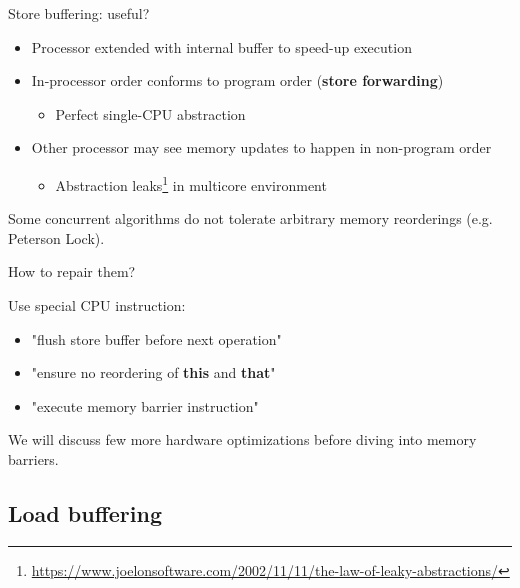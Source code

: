 \begin{frame}{Store buffering: useful?}

\begin{itemize}
    \item Processor extended with internal buffer to speed-up execution
    \item In-processor order conforms to program order (\textbf{store forwarding})
    \begin{itemize}
        \item Perfect single-CPU abstraction
    \end{itemize}
    \item Other processor may see memory updates to happen in non-program order
    \begin{itemize}
        \item Abstraction leaks\footnote{\tiny\url{https://www.joelonsoftware.com/2002/11/11/the-law-of-leaky-abstractions/}} in multicore environment
    \end{itemize}
\end{itemize}

\pause
Some concurrent algorithms do not tolerate arbitrary memory reorderings (e.g. Peterson Lock).

\pause

How to repair them?

\pause

Use special CPU instruction:
\begin{itemize}
    \pause
    \item "flush store buffer before next operation"
    \pause
    \item "ensure no reordering of \textbf{this} and \textbf{that}"
    \pause
    \item "execute memory barrier instruction"
\end{itemize}

\pause

We will discuss few more hardware optimizations before diving into memory barriers.

\end{frame}


\subsection{Load buffering}
\showTOCSub

